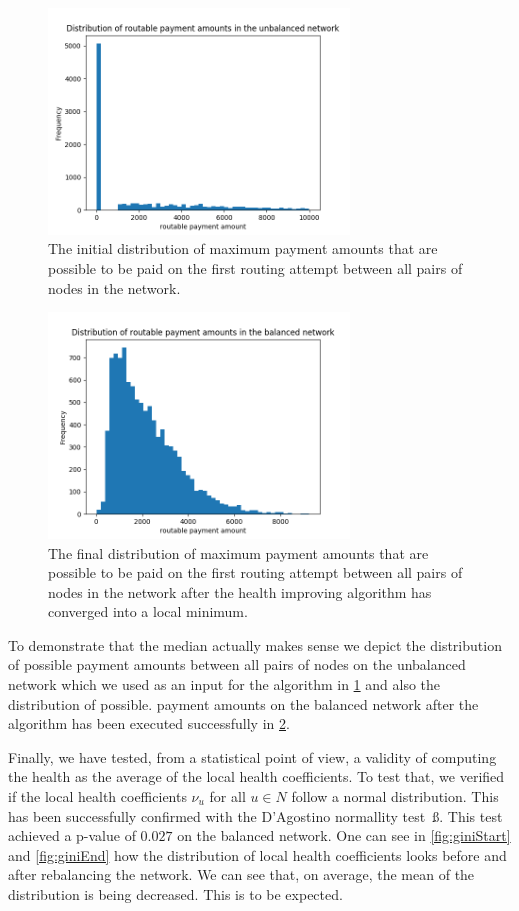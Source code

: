 \documentclass[a4paper]{paper}
\begin{document}
\begin{figure}
 \centering
 \includegraphics[width=8cm]{code/results/routabilityTest/paymentamtUnbalanced.png}
 \caption{The initial distribution of maximum payment amounts that are possible to be paid on the first routing attempt between all pairs of nodes in the network.}
 \label{fig:paymentUnbalanced}
\end{figure}

\begin{figure}
 \centering
 \includegraphics[width=8cm]{code/results/routabilityTest/paymentamtBalanced.png}
 \caption{The final distribution of maximum payment amounts that are possible to be paid on the first routing attempt between all pairs of nodes in the network after the health improving algorithm has converged into a local minimum.}
 \label{fig:paymentBalanced}
\end{figure}

To demonstrate that the median actually makes sense we depict the distribution of possible payment amounts between all pairs of nodes on the unbalanced network which we used as an input for the algorithm in \cref{fig:paymentUnbalanced} and also the distribution of possible. payment amounts on the balanced network after the algorithm has been executed successfully in \cref{fig:paymentBalanced}.

Finally, we have tested, from a statistical point of view, a validity of computing the health as the average of the local health coefficients.
To test that, we verified if the local health coefficients $\nu_u$ for all $u \in N$ follow a normal distribution. This has been successfully confirmed with the D'Agostino normallity test~ß\cite{d1971omnibus}.
This test achieved a p-value of $0.027$ on the balanced network.
One can see in \cref{fig:giniStart} and \cref{fig:giniEnd} how the distribution of local health coefficients looks before and after rebalancing the network. We can see that, on average, the mean of the distribution is being decreased. This is to be expected. 
\end{document}

